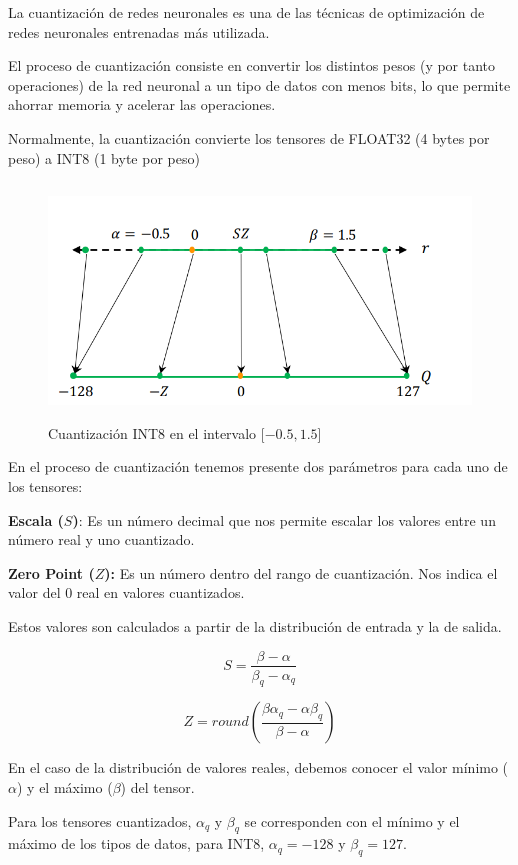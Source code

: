 La cuantización de redes neuronales es una de las técnicas de
optimización de redes neuronales entrenadas más utilizada.

El proceso de cuantización consiste en convertir los distintos pesos (y
por tanto operaciones) de la red neuronal a un tipo de datos con menos
bits, lo que permite ahorrar memoria y acelerar las operaciones.

Normalmente, la cuantización convierte los tensores de FLOAT32 (4 bytes
por peso) a INT8 (1 byte por peso)

\begin{figure}
    \centering

    \includegraphics[width=5in,height=2.46875in]{img/3/quant.png}
    \caption{Cuantización INT8 en el intervalo $[-0.5,1.5$]}
    \label{fig:quant}
\end{figure}

En el proceso de cuantización tenemos presente dos parámetros para cada
uno de los tensores:

\textbf{Escala ($S$)}: Es un número decimal que nos permite escalar los
valores entre un número real y uno cuantizado.

\textbf{Zero Point ($Z$):} Es un número dentro del rango de cuantización.
Nos indica el valor del 0 real en valores cuantizados.

Estos valores son calculados a partir de la distribución de entrada y la
de salida.

$$
S = \frac{\beta - \alpha}{\beta_q - \alpha_q}
$$

$$
Z = round(\frac{\beta\alpha_q - \alpha\beta_q}{\beta-\alpha})
$$

En el caso de la distribución de valores reales, debemos conocer el valor mínimo
($\alpha$) y el máximo ($\beta$) del tensor.

Para los tensores cuantizados, $\alpha_q$ y $\beta_q$ se corresponden con el mínimo y el máximo de
los tipos de datos, para INT8,  $\alpha_q = -128$ y $\beta_q = 127$.

